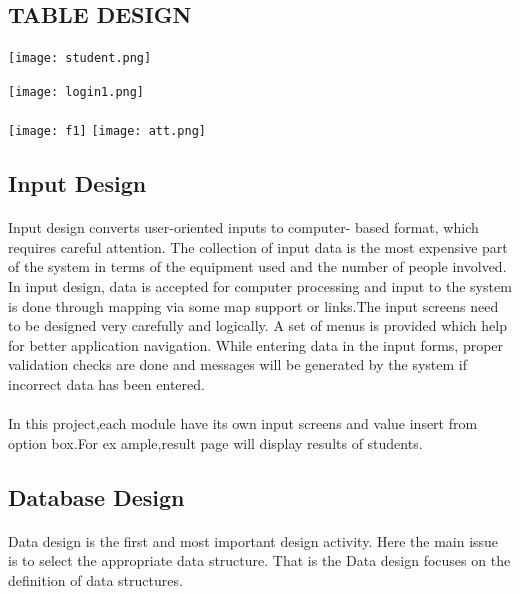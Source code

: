 \documentclass[a4paper, 12pt]{report}
\begin{document}
\newpage
\subsection{TABLE DESIGN}

\texttt{[image: student.png]}

\texttt{[image: login1.png]}
\paragraph{}
\texttt{[image: f1]}
\newpage
\texttt{[image: att.png]}
\newpage
\subsection{Input Design}
\fontsize{12pt}{12pt}\selectfont
\paragraph{}
Input design converts user-oriented inputs to computer- based format, which requires careful attention. The collection of input data is the most expensive part of the system in terms of the equipment used and the number of people involved. In input design, data is accepted for computer processing and input to the system is done through mapping via some map support or links.The input screens need to be designed very carefully and logically. A set of menus is provided which help for better application navigation. While entering data in the input forms, proper validation checks are done and messages will be generated by the system if incorrect data has been entered.
\paragraph{}
In this project,each module have its own input screens and value insert from option box.For ex
ample,result page will display results of students.
\fontsize{14pt}{14pt}\selectfont
\subsection{Database Design}
\fontsize{12pt}{12pt}\selectfont
\paragraph{}
Data design is the first and most important design activity. Here the main issue is to select the appropriate data structure. That is the Data design focuses on the definition of data structures.
\end{document}
